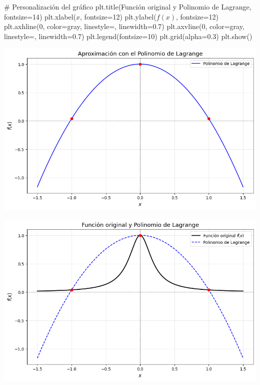 \documentclass[
  letterpaper,
  DIV=11,
  numbers=noendperiod]{scrartcl}
\newenvironment{Shaded}{\begin{snugshade}}{\end{snugshade}}
\newcommand{\CommentTok}[1]{\textcolor[rgb]{0.37,0.37,0.37}{#1}}
\newcommand{\DecValTok}[1]{\textcolor[rgb]{0.68,0.00,0.00}{#1}}
\newcommand{\FloatTok}[1]{\textcolor[rgb]{0.68,0.00,0.00}{#1}}
\newcommand{\NormalTok}[1]{\textcolor[rgb]{0.00,0.23,0.31}{#1}}
\newcommand{\OperatorTok}[1]{\textcolor[rgb]{0.37,0.37,0.37}{#1}}
\newcommand{\StringTok}[1]{\textcolor[rgb]{0.13,0.47,0.30}{#1}}
\begin{document}
\begin{Shaded}
\begin{Highlighting}[]
\CommentTok{\# Personalización del gráfico}
\NormalTok{plt.title(}\StringTok{\textquotesingle{}Función original y Polinomio de Lagrange\textquotesingle{}}\NormalTok{, fontsize}\OperatorTok{=}\DecValTok{14}\NormalTok{)}
\NormalTok{plt.xlabel(}\StringTok{\textquotesingle{}$x$\textquotesingle{}}\NormalTok{, fontsize}\OperatorTok{=}\DecValTok{12}\NormalTok{)}
\NormalTok{plt.ylabel(}\StringTok{\textquotesingle{}$f(x)$\textquotesingle{}}\NormalTok{, fontsize}\OperatorTok{=}\DecValTok{12}\NormalTok{)}
\NormalTok{plt.axhline(}\DecValTok{0}\NormalTok{, color}\OperatorTok{=}\StringTok{\textquotesingle{}gray\textquotesingle{}}\NormalTok{, linestyle}\OperatorTok{=}\StringTok{\textquotesingle{}{-}{-}\textquotesingle{}}\NormalTok{, linewidth}\OperatorTok{=}\FloatTok{0.7}\NormalTok{)}
\NormalTok{plt.axvline(}\DecValTok{0}\NormalTok{, color}\OperatorTok{=}\StringTok{\textquotesingle{}gray\textquotesingle{}}\NormalTok{, linestyle}\OperatorTok{=}\StringTok{\textquotesingle{}{-}{-}\textquotesingle{}}\NormalTok{, linewidth}\OperatorTok{=}\FloatTok{0.7}\NormalTok{)}
\NormalTok{plt.legend(fontsize}\OperatorTok{=}\DecValTok{10}\NormalTok{)}
\NormalTok{plt.grid(alpha}\OperatorTok{=}\FloatTok{0.3}\NormalTok{)}
\NormalTok{plt.show()}
\end{Highlighting}
\end{Shaded}

\includegraphics{Deber6_files/figure-pdf/cell-4-output-1.png}

\includegraphics{Deber6_files/figure-pdf/cell-4-output-2.png}
\end{document}
